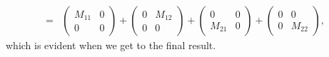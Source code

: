 \documentclass[10pt,a4paper]{article}
\begin{document}
\begin{equation}
\begin{aligned}
	\\=& 
	\begin{pmatrix}	M_{11} & 0 \\ 0 & 0 	\end{pmatrix}+
	\begin{pmatrix}	0 & M_{12} \\ 0 & 0 	\end{pmatrix}+
	\begin{pmatrix}	0 & 0 \\ M_{21} & 0 	\end{pmatrix}+ 
	\begin{pmatrix}	0 & 0 \\ 0 & M_{22} 	\end{pmatrix},
	\end{aligned}
	\end{equation}
	which is evident when we get to the final result.
	
\end{document}
